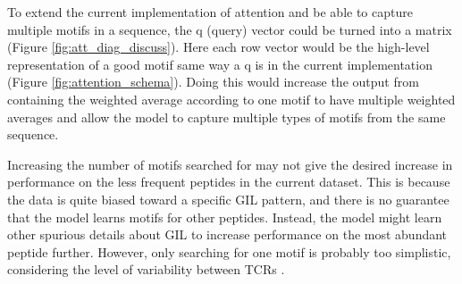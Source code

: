 To extend the current implementation of attention and be able to capture multiple motifs in a sequence, the q (query) vector could be turned into a matrix (Figure \ref{fig:att_diag_discuss}). Here each row vector would be the high-level representation of a good motif same way a q is in the current implementation (Figure \ref{fig:attention_schema}). Doing this would increase the output from containing the weighted average according to one motif to have multiple weighted averages and allow the model to capture multiple types of motifs from the same sequence.

Increasing the number of motifs searched for may not give the desired increase in performance on the less frequent peptides in the current dataset. This is because the data is quite biased toward a specific GIL pattern, and there is no guarantee that the model learns motifs for other peptides. Instead, the model might learn other spurious details about GIL to increase performance on the most abundant peptide further. However, only searching for one motif is probably too simplistic, considering the level of variability between TCRs \cite{Sewell2012WhyCross-reactive}.

